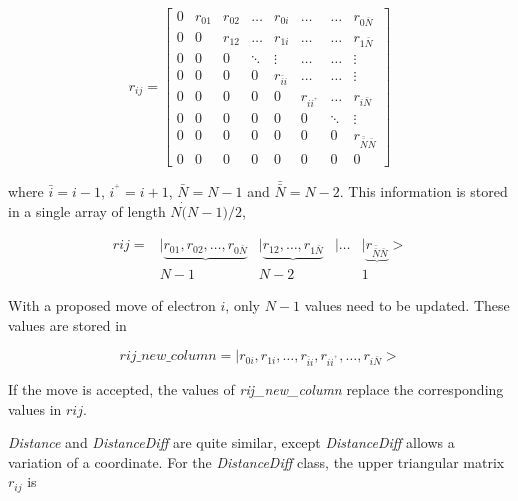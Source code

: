 \begin{equation}
  r_{ij} = \left[
  \begin{array}{ccccccccc}
    0&r_{01}&r_{02}&\dots & r_{0i} &\dots &\dots & r_{0 \bar{N}} \\
    0&  0   &r_{12}&\dots & r_{1i} &\dots &\dots & r_{1 \bar{N}} \\
    0&  0   &  0   &\ddots& \vdots &\dots &\dots & \vdots       \\
    0&  0   &  0   &0& r_{\bar{i}i}&\dots &\dots & \vdots       \\
    0&  0   &  0   &  0   &  0&r_{ii^{^+}}&\dots & r_{i \bar{N}} \\
    0&  0   &  0   &  0   &   0    &  0   &\ddots& \vdots \\
    0&  0   &  0   &  0   &   0    &  0   & 0    &r_{\bar{\bar{N}} \bar{N}} \\
    0&  0   &  0   &  0   &   0    &  0   & 0    &  0
  \end{array} \right]
\label{r_ij}
\end{equation}

where $\bar{i}=i-1$, $i^{^+}=i+1$, $\bar{N}=N-1$ and
$\bar{\bar{N}}=N-2$. This information is stored in a single array of
length $N\dot(N-1)/2$, 

\begin{equation}
  \begin{array}{ccccc}
  rij =
  &|\underbrace{r_{01}, r_{02}, \dots, r_{0 \bar{N}} }
  &|\underbrace{ r_{12}, \dots, r_{1 \bar{N}} }
  &| \dots &|\underbrace{ r_{\bar{\bar{N}} \bar{N}} }  >\\
  & N-1 & N-2 & & 1\phantom{ii}
  \end{array}
  \label{r_ij_array}
\end{equation}

With a proposed move of electron $i$, only $N-1$ values need to be
updated. These values are stored in 

\begin{equation}
  rij\_new\_column = | r_{0i}, r_{1i}, \dots, r_{\bar{i}i}, r_{ii^{^+}},
  \dots, r_{i \bar{N}} >
\end{equation}

If the move is accepted, the values of \emph{rij\_new\_column} replace the
corresponding values in $rij$.

\emph{Distance} and
\emph{DistanceDiff} are quite similar, except \emph{DistanceDiff}
allows a variation of a coordinate.
For the \emph{DistanceDiff} class, the upper triangular matrix $r_{ij}$
is

